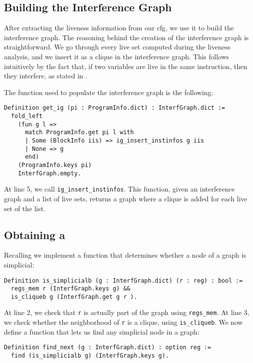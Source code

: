 \subsection{Building the Interference Graph}
\label{subsec:ig}

After extracting the liveness information from our \gls{cfg}, we use it to build the interference graph.
The reasoning behind the creation of the interference graph is straightforward. We go through every live set computed during the liveness analysis, and we insert it as a clique in the interference graph. This follows intuitively by the fact that, if two variables are live in the same instruction, then they interfere, as stated in .

The function used to populate the interference graph is the following:

\begin{lstlisting}[style=Rocq]
Definition get_ig (pi : ProgramInfo.dict) : InterfGraph.dict :=
  fold_left
    (fun g l =>
      match ProgramInfo.get pi l with
      | Some (BlockInfo iis) => ig_insert_instinfos g iis
      | None => g
      end)
    (ProgramInfo.keys pi)
    InterfGraph.empty.
\end{lstlisting}

At line 5, we call \texttt{ig\_insert\_instinfos}. This function, given an interference graph and a list of live sets, returns a graph where a clique is added for each live set of the list.

\subsection{Obtaining a }
\label{subsec:peo}

Recalling  we implement a function that determines whether a node of a graph is simplicial:

\begin{lstlisting}[style=Rocq]
Definition is_simplicialb (g : InterfGraph.dict) (r : reg) : bool :=
  regs_mem r (InterfGraph.keys g) &&
  is_cliqueb g (InterfGraph.get g r ).
\end{lstlisting}

At line 2, we check that \texttt r is actually part of the graph using \texttt{regs\_mem}. At line 3, we check whether the neighborhood of \texttt r is a clique, using \texttt{is\_cliqueb}.
We now define a function that lets us find any simplicial node in a graph:

\begin{lstlisting}[style=Rocq]
Definition find_next (g : InterfGraph.dict) : option reg :=
  find (is_simplicialb g) (InterfGraph.keys g).
\end{lstlisting}

